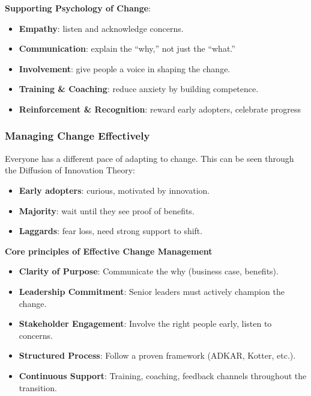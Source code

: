 \noindent\textbf{Supporting Psychology of Change}:

\begin{itemize}
    \item \textbf{Empathy}: listen and acknowledge concerns.
    \item \textbf{Communication}: explain the “why,” not just the “what.”
    \item \textbf{Involvement}: give people a voice in shaping the change.
    \item \textbf{Training \& Coaching}: reduce anxiety by building competence.
    \item \textbf{Reinforcement \& Recognition}: reward early adopters, celebrate progress
\end{itemize}

\subsubsection{Managing Change Effectively}

\indent

Everyone has a different pace of adapting to change. This can be seen through the Diffusion of Innovation Theory:

\begin{itemize}
    \item \textbf{Early adopters}: curious, motivated by innovation.
    \item \textbf{Majority}: wait until they see proof of benefits.
    \item \textbf{Laggards}: fear loss, need strong support to shift.
\end{itemize}

\bigskip

\noindent\textbf{Core principles of Effective Change Management}

\begin{itemize}
    \item \textbf{Clarity of Purpose}: Communicate the why (business case, benefits).
    \item \textbf{Leadership Commitment}: Senior leaders must actively champion the change.
    \item \textbf{Stakeholder Engagement}: Involve the right people early, listen to concerns.
    \item \textbf{Structured Process}: Follow a proven framework (ADKAR, Kotter, etc.).
    \item \textbf{Continuous Support}: Training, coaching, feedback channels throughout the transition.
\end{itemize}


